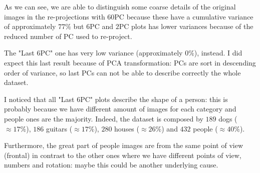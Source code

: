 \documentclass[a4paper, 11pt]{article}
\begin{document}
	As we can see, we are able to distinguish some coarse details of the original images in the re-projections with 60PC because these have a cumulative variance of approximately $77\%$ but $6$PC and $2$PC plots has lower variances because of the reduced number of PC used to re-project.
	
	The "Last $6$PC" one has very low variance (approximately $0\%$), instead. I did expect this last result because of PCA transformation: PCs are sort in descending order of variance, so last PCs can not be able to describe correctly the whole dataset.
	
	I noticed that all "Last $6$PC" plots describe the shape of a person: this is probably because we have different amount of images for each category and people ones are the majority. Indeed, the dataset is composed by $189$ dogs ($\approx17\%$), $186$ guitars ($\approx17\%$), $280$ houses ($\approx26\%$) and $432$ people ($\approx40\%$).
	
	Furthermore, the great part of people images are from the same point of view (frontal) in contrast to the other ones where we have different points of view, numbers and rotation: maybe this could be another underlying cause.
		
\end{document}
